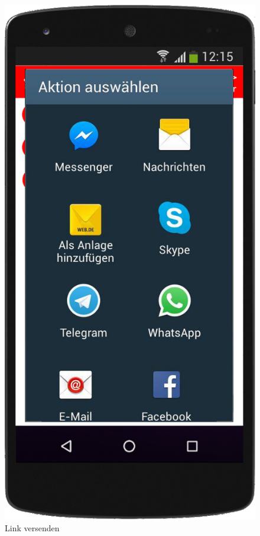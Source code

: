 \begin{figure}
	\includegraphics[scale=0.2]{resources/images/handy/link_versenden.png}
	\caption{Link versenden}
\end{figure}

